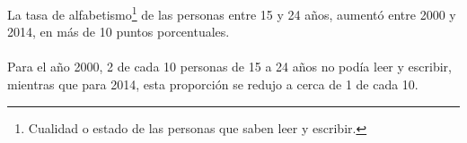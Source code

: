 La tasa de alfabetismo\footnote{Cualidad o estado de las personas que saben leer y escribir.} de las personas entre 15 y 24 años, aumentó entre 2000 y 2014, en más de 10 puntos porcentuales. \\\\
Para el año 2000, 2 de cada 10 \mbox{personas} de 15 a 24 años no podía leer y escribir, mientras que para 2014, esta proporción se redujo a cerca de 1 de cada 10.